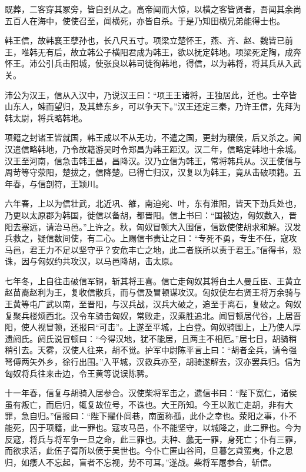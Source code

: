 \documentclass[12pt,UTF8]{ctexbook}
\begin{document}
既葬，二客穿其冢旁，皆自刭从之。高帝闻而大惊，以横之客皆贤者，吾闻其余尚五百人在海中，使使召至，闻横死，亦皆自杀。于是乃知田横兄弟能得士也。



韩王信，故韩襄王孽孙也，长八尺五寸。项梁立楚怀王，燕、齐、赵、魏皆已前王，唯韩无有后，故立韩公子横阳君成为韩王，欲以抚定韩地。项梁死定陶，成奔怀王。沛公引兵击阳城，使张良以韩司徒徇韩地，得信，以为韩将，将其兵从入武关。



沛公为汉王，信从入汉中，乃说汉王曰：“项王王诸将，王独居此，迁也。士卒皆山东人，竦而望归，及其蜂东乡，可以争天下。”汉王还定三秦，乃许王信，先拜为韩太尉，将兵略韩地。



项籍之封诸王皆就国，韩王成以不从无功，不遣之国，更封为穰侯，后又杀之。闻汉遣信略韩地，乃令故籍游吴时令郑昌为韩王距汉。汉二年，信略定韩地十余城。汉王至河南，信急击韩王昌，昌降汉。汉乃立信为韩王，常将韩兵从。汉王使信与周苛等守荥阳，楚拔之，信降楚。已得亡归汉，汉复以为韩王，竟从击破项籍。五年春，与信剖符，王颖川。



六年春，上以为信壮武，北近巩、雒，南迫宛、叶，东有淮阳，皆天下劲兵处也，乃更以太原郡为韩国，徙信以备胡，都晋阳。信上书曰：“国被边，匈奴数入，晋阳去塞远，请治马邑。”上许之。秋，匈奴冒顿大入围信，信数使使胡求和解。汉发兵救之，疑信数间使，有二心。上赐信书责让之曰：“专死不勇，专生不任，寇攻马邑，君王力不足以坚守乎？安危丰亡之地，此二者朕所以责于君王。”信得书，恐诛，因与匈奴约共攻汉，以马邑降胡，击太原。



七年冬，上自往击破信军铜，斩其将王喜。信亡走匈奴其将白土人曼丘臣、王黄立赵苗裔赵利为王，复收信散兵，而与信及冒顿谋攻汉。匈奴使左右贤王将万余骑与王黄等屯广武以南，至晋阳，与汉兵战，汉兵大破之，追至于离石，复破之。匈奴复聚兵楼烦西北。汉令车骑击匈奴，常败走，汉乘胜追北。闻冒顿居代谷，上居晋阳，使人视冒顿，还报曰“可击”。上遂至平城，上白登。匈奴骑围上，上乃使人厚遗阏氏。阏氏说冒顿曰：“今得汉地，犹不能居，且两主不相厄。”居七日，胡骑稍稍引去。天雾，汉使人往来，胡不觉。护军中尉陈平言上曰：“胡者全兵，请令强弩傅两矢外乡，徐行出围。”入平城，汉救兵亦至，胡骑遂解去，汉亦罢兵归。信为匈奴将兵往来击边，令王黄等说误陈豨。



十一年春，信复与胡骑入居参合。汉使柴将军击之，遗信书曰：“陛下宽仁，诸侯虽有叛亡，而后归，辄复故位号，不诛也。大王所知。今王以败亡走胡，非有大罪，急自归。”信报曰：“陛下擢仆闾巷，南面称孤，此仆之幸也。荥阳之事，仆不能死，囚于项籍，此一罪也。寇攻马邑，仆不能坚守，以城降之，此二罪也。今为反寇，将兵与将军争一旦之命，此三罪也。夫种、蠡无一罪，身死亡；仆有三罪，而欲求活，此伍子胥所以偾于吴世也。今仆亡匿山谷间，旦暮乞貣蛮夷，仆之思归，如痿人不忘起，盲者不忘视，势不可耳。”遂战。柴将军屠参合，斩信。
\end{document}
